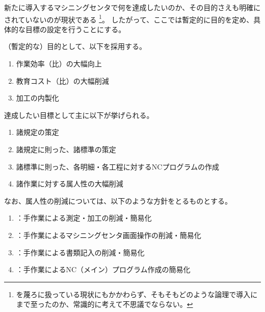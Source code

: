 

新たに導入するマシニングセンタで何を達成したいのか、その目的さえも明確にされていないのが現状である
\footnote{\MMC を蔑ろに扱っている現状にもかかわらず、そもそもどのような論理で導入にまで至ったのか、常識的に考えて不思議でならない。}。
したがって、ここでは暫定的に目的を定め、具体的な目標の設定を行うことにする。



（暫定的な）目的として、以下を採用する。
\begin{enumerate}[label=\sarrow]
\item 作業効率（\MMC 比）の大幅向上
\item 教育コスト（\MMC 比）の大幅削減
\item \Dimple 加工の内製化
\end{enumerate}



達成したい目標として主に以下が挙げられる。
\begin{enumerate}[label=\sarrow]
\item 諸規定の策定
\item 諸規定に則った、諸標準の策定
\item 諸標準に則った、各明細・各工程に対するNCプログラムの作成
\item 諸作業に対する属人性の大幅削減
\end{enumerate}
なお、属人性の削減については、以下のような方針をとるものとする。
\begin{enumerate}[label=\sarrow]
\item {}：手作業による測定・加工の削減・簡易化
\item {}：手作業によるマシニングセンタ画面操作の削減・簡易化
\item {}：手作業による書類記入の削減・簡易化
\item {}：手作業によるNC（メイン）プログラム作成の簡易化
\end{enumerate}



